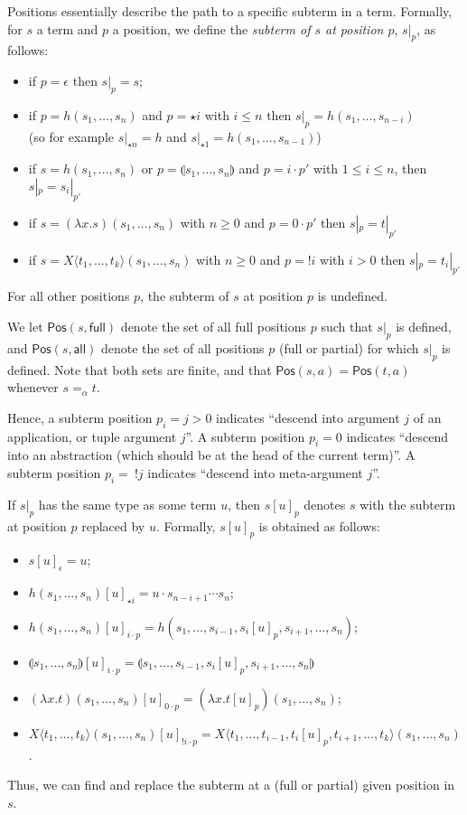 \documentclass{lmcs}
\theoremstyle{theorem}\newtheorem{theorem}{Theorem}
\theoremstyle{theorem}\newtheorem{lemma}[theorem]{Lemma}
\theoremstyle{theorem}\newtheorem{corollary}[theorem]{Corollary}
\theoremstyle{definition}\newtheorem{definition}[theorem]{Definition}
\theoremstyle{definition}\newtheorem{example}[theorem]{Example}
\newcommand{\Positions}{\mathsf{Pos}}
\newcommand{\avar}{x}
\newcommand{\Avar}{X}
\newcommand{\abs}[2]{\lambda #1.#2}
\newcommand{\meta}[2]{#1\langle#2\rangle}
\newcommand{\tuple}[2]{\llparenthesis #1,\dots,#2 \rrparenthesis}
\newcommand{\tuplelong}[1]{\llparenthesis #1 \rrparenthesis}
\begin{document}
Positions essentially describe the path to a specific subterm in a term.
Formally, for $s$ a term and $p$ a position, we define the \emph{subterm of $s$
at position $p$}, $s|_p$, as follows:
\begin{itemize}
\item if $p = \epsilon$ then $s|_p = s$;
\item if $p = h(s_1,\dots,s_n)$ and $p = \star i$ with $i \leq n$ then
  $s|_p = h(s_1,\dots,s_{n-i})$ \\
    (so for example $s|_{\star n} = h$ and $s|_{\star 1} =
    h(s_1,\dots,s_{n-1})$)
\item if $s = h(s_1,\dots,s_n)$ or $p = \tuple{s_1}{s_n}$ and $p = i \cdot p'$
  with $1 \leq i \leq n$, then $s|_p = s_i|_{p'}$
\item if $s = (\abs{\avar}{s})(s_1,\dots,s_n)$ with $n \geq 0$ and $p = 0 \cdot
  p'$ then $s|_p = t|_{p'}$
\item if $s = \meta{\Avar}{t_1,\dots,t_k}(s_1,\dots,s_n)$ with $n \geq 0$ and
  $p = !i$ with $i > 0$ then $s|_p = t_i|_{p'}$
\end{itemize}
For all other positions $p$, the subterm of $s$ at position $p$ is undefined.

We let $\Positions(s,\mathsf{full})$ denote the set of all full positions $p$
such that $s|_p$ is defined, and $\Positions(s,\mathsf{all})$ denote the
set of all positions $p$ (full or partial) for which $s|_p$ is defined.  Note
that both sets are finite, and that $\Positions(s,a) = \Positions(t,a)$ whenever
$s =_\alpha t$.

Hence, a subterm position $p_i = j > 0$ indicates ``descend into argument $j$
of an application, or tuple argument $j$''.  A subterm position $p_i = 0$
indicates ``descend into an abstraction (which should be at the head of the
current term)''.  A subterm position $p_i =\ !j$ indicates ``descend into
meta-argument $j$''.

If $s|_p$ has the same type as some term $u$, then $s[u]_p$ denotes $s$ with
the subterm at position $p$ replaced by $u$.  Formally, $s[u]_p$ is obtained as
follows:
\begin{itemize}
\item $s[u]_\epsilon = u$;
\item $h(s_1,\dots,s_n)[u]_{\star i} = u \cdot s_{n-i+1} \cdots s_n$;
\item $h(s_1,\dots,s_n)[u]_{i \cdot p} = h(s_1,\dots,s_{i-1},s_i[u]_p,s_{i+1},
  \dots,s_n)$;
\item $\tuple{s_1}{s_n}[u]_{i \cdot p} = \tuplelong{s_1,\dots,s_{i-1},s_i[u]_p,
  s_{i+1},\dots,s_n}$
\item $(\abs{\avar}{t})(s_1,\dots,s_n)[u]_{0 \cdot p} =
  (\abs{\avar}{t[u]_p})(s_1,\dots,s_n)$;
\item $\meta{\Avar}{t_1,\dots,t_k}(s_1,\dots,s_n)[u]_{!i \cdot p} =
  \meta{\Avar}{t_1,\dots,t_{i-1},t_i[u]_p,t_{i+1},\dots,t_k}(s_1,\dots,s_n)$.
\end{itemize}
Thus, we can find and replace the subterm at a (full or partial) given position
in $s$.
\end{document}
